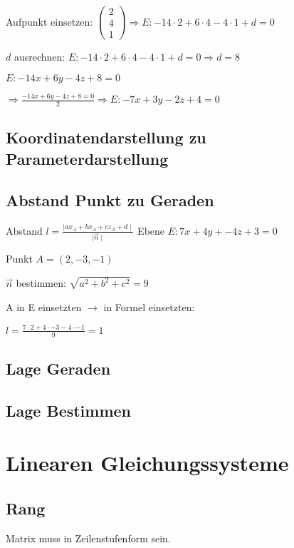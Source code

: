 \begin{multicols*}{3}
     Aufpunkt einsetzen: $\begin{pmatrix}
            2 \\
            4 \\
            1
        \end{pmatrix} 	\Rightarrow  E: -14 \cdot 2  + 6 \cdot 4 - 4\cdot 1 + d = 0 $

     $d$ ausrechnen: $ E: -14 \cdot 2  + 6 \cdot 4 - 4\cdot 1 + d = 0 \Rightarrow d = 8$

     $E: -14x + 6y - 4z + 8 = 0$

    $\Rightarrow \frac{-14x + 6y - 4z + 8 = 0}{2} \Rightarrow E: -7x + 3y - 2z + 4 = 0$

    \subsection{Koordinatendarstellung zu Parameterdarstellung }


    \subsection{Abstand Punkt zu Geraden}
    {Abstand \Large $  l = \frac{\mid ax_A + bx_A + cz_A + d  \mid}{\mid \vec{n} \mid}$ }
    {Ebene $E:  7x+4y+-4z+3=0 $}

    {Punkt $A = (2,-3,-1)$}


    { $\vec{n}$ bestimmen: $\sqrt{a^2+b^2+c^2} = 9$}

    { A in E einsetzten $ \rightarrow $ in Formel einsetzten: }

    {$l = \frac{7 \cdot 2 + 4 \cdot -3 -4 \cdot -1}{9} = 1$}

    \subsection{Lage Geraden}

    \subsection{Lage Bestimmen}

    \section{Linearen Gleichungssysteme}
    \subsection{Rang}
    {Matrix muss in Zeilenstufenform sein.}


\end{multicols*}
